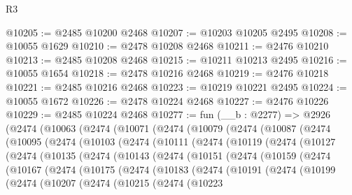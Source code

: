 \begin{lexlean}{R3}
\begin{coremodule}
@10205 := @2485 @10200 @2468
@10207 := @10203 @10205 @2495
@10208 := @10055 @1629
@10210 := @2478 @10208 @2468
@10211 := @2476 @10210
@10213 := @2485 @10208 @2468
@10215 := @10211 @10213 @2495
@10216 := @10055 @1654
@10218 := @2478 @10216 @2468
@10219 := @2476 @10218
@10221 := @2485 @10216 @2468
@10223 := @10219 @10221 @2495
@10224 := @10055 @1672
@10226 := @2478 @10224 @2468
@10227 := @2476 @10226
@10229 := @2485 @10224 @2468
@10277 := fun (__b : @2277) =>
  @2926
    (@2474
      (@10063
        (@2474
          (@10071
            (@2474
              (@10079
                (@2474
                  (@10087
                    (@2474
                      (@10095
                        (@2474
                          (@10103
                            (@2474
                              (@10111
                                (@2474
                                  (@10119
                                    (@2474
                                      (@10127
                                        (@2474
                                          (@10135
                                            (@2474
                                              (@10143
                                                (@2474
                                                  (@10151
                                                    (@2474
                                                      (@10159
                                                        (@2474
                                                          (@10167
                                                            (@2474
                                                              (@10175
                                                                (@2474
                                                                  (@10183
                                                                    (@2474
                                                                      (@10191
                                                                        (@2474
                                                                          (@10199
                                                                            (@2474
                                                                              (@10207
                                                                                (@2474
                                                                                  (@10215
                                                                                    (@2474
                                                                                      (@10223

\end{coremodule}
\end{lexlean}
